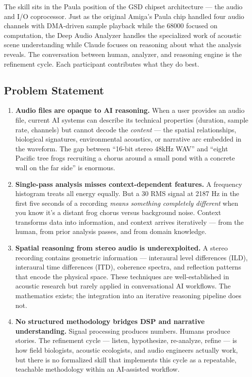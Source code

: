 \documentclass[11pt,letterpaper]{article}
\begin{document}
The skill sits in the Paula position of the GSD chipset architecture --- the audio and I/O coprocessor. Just as the original Amiga's Paula chip handled four audio channels with DMA-driven sample playback while the 68000 focused on computation, the Deep Audio Analyzer handles the specialized work of acoustic scene understanding while Claude focuses on reasoning about what the analysis reveals. The conversation between human, analyzer, and reasoning engine is the refinement cycle. Each participant contributes what they do best.

\subsection{Problem Statement}

\begin{enumerate}[leftmargin=2em]
\item \textbf{Audio files are opaque to AI reasoning.} When a user provides an audio file, current AI systems can describe its technical properties (duration, sample rate, channels) but cannot decode the \textit{content} --- the spatial relationships, biological signatures, environmental acoustics, or narrative arc embedded in the waveform. The gap between ``16-bit stereo 48kHz WAV'' and ``eight Pacific tree frogs recruiting a chorus around a small pond with a concrete wall on the far side'' is enormous.

\item \textbf{Single-pass analysis misses context-dependent features.} A frequency histogram treats all energy equally. But a 30 RMS signal at 2187 Hz in the first five seconds of a recording \textit{means something completely different} when you know it's a distant frog chorus versus background noise. Context transforms data into information, and context arrives iteratively --- from the human, from prior analysis passes, and from domain knowledge.

\item \textbf{Spatial reasoning from stereo audio is underexploited.} A stereo recording contains geometric information --- interaural level differences (ILD), interaural time differences (ITD), coherence spectra, and reflection patterns that encode the physical space. These techniques are well-established in acoustic research but rarely applied in conversational AI workflows. The mathematics exists; the integration into an iterative reasoning pipeline does not.

\item \textbf{No structured methodology bridges DSP and narrative understanding.} Signal processing produces numbers. Humans produce stories. The refinement cycle --- listen, hypothesize, re-analyze, refine --- is how field biologists, acoustic ecologists, and audio engineers actually work, but there is no formalized skill that implements this cycle as a repeatable, teachable methodology within an AI-assisted workflow.


\end{enumerate}
\end{document}
